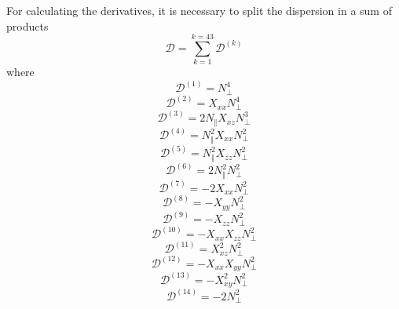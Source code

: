 \documentclass[a4paper,12pt]{article}%
\begin{document}
For calculating the derivatives, it is necessary to split the dispersion in a
sum of products%
\begin{equation}
\mathcal{D}=\sum_{k=1}^{k=43}\mathcal{D}^{\left(  k\right)  }%
\end{equation}
where%
\begin{equation}
\mathcal{D}^{\left(  1\right)  }=N_{\bot}^{4}%
\end{equation}%
\begin{equation}
\mathcal{D}^{\left(  2\right)  }=X_{xx}N_{\bot}^{4}%
\end{equation}%
\begin{equation}
\mathcal{D}^{\left(  3\right)  }=2N_{\Vert}X_{xz}N_{\bot}^{3}%
\end{equation}%
\begin{equation}
\mathcal{D}^{\left(  4\right)  }=N_{\Vert}^{2}X_{xx}N_{\bot}^{2}%
\end{equation}%
\begin{equation}
\mathcal{D}^{\left(  5\right)  }=N_{\Vert}^{2}X_{zz}N_{\bot}^{2}%
\end{equation}%
\begin{equation}
\mathcal{D}^{\left(  6\right)  }=2N_{\Vert}^{2}N_{\bot}^{2}%
\end{equation}%
\begin{equation}
\mathcal{D}^{\left(  7\right)  }=-2X_{xx}N_{\bot}^{2}%
\end{equation}%
\begin{equation}
\mathcal{D}^{\left(  8\right)  }=-X_{yy}N_{\bot}^{2}%
\end{equation}%
\begin{equation}
\mathcal{D}^{\left(  9\right)  }=-X_{zz}N_{\bot}^{2}%
\end{equation}%
\begin{equation}
\mathcal{D}^{\left(  10\right)  }=-X_{xx}X_{zz}N_{\bot}^{2}%
\end{equation}%
\begin{equation}
\mathcal{D}^{\left(  11\right)  }=X_{xz}^{2}N_{\bot}^{2}%
\end{equation}%
\begin{equation}
\mathcal{D}^{\left(  12\right)  }=-X_{xx}X_{yy}N_{\bot}^{2}%
\end{equation}%
\begin{equation}
\mathcal{D}^{\left(  13\right)  }=-X_{xy}^{2}N_{\bot}^{2}%
\end{equation}%
\begin{equation}
\mathcal{D}^{\left(  14\right)  }=-2N_{\bot}^{2}%
\end{equation}%
\end{document}
